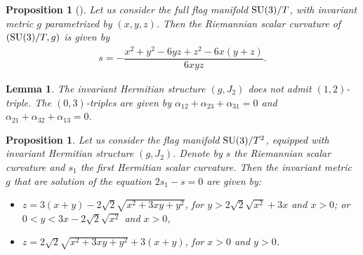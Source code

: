 \documentclass[pdftex]{sigma}%
\numberwithin{equation}{section}
\newtheorem{Lemma}[Theorem]{Lemma}
\newtheorem{Proposition}[Theorem]{Proposition}
 { \theoremstyle{definition}
\newtheorem{Definition}[Theorem]{Definition}
\newtheorem{Question}[Theorem]{Question}
\newtheorem*{Notation}{Notation}
\newtheorem{Example}[Theorem]{Example}
\newtheorem{Remark}[Theorem]{Remark} }
\begin{document}
\begin{Proposition}[\cite{grego}]
Let us consider the full flag manifold ${\rm SU}(3)/T$, with invariant metric $g$ parametrized by $(x,y,z)$. Then the Riemannian scalar curvature of $({\rm SU}(3)/T,g)$ is given by
\begin{gather*}
s= -\dfrac{x^{2}+y^{2}-6yz+z^{2}-6x(y+z)}{6xyz}.
\end{gather*}
\end{Proposition}

\begin{Lemma}
The invariant Hermitian structure $(g, J_{2})$ does not admit $(1,2)$-triple. The $(0,3)$-triples are given by $\alpha_{12}+\alpha_{23}+\alpha_{31}=0$ and $\alpha_{21}+\alpha_{32}+\alpha_{13}=0$.
\end{Lemma}

\begin{Proposition} \label{curv-su3}
Let us consider the flag manifold ${\rm SU}(3)/T^2$, equipped with invariant Hermitian structure $(g, J_{2})$. Denote by $s$ the Riemannian scalar curvature and $s_1$ the first Hermitian scalar curvature. Then the invariant metric $g$ that are solution of the equation $2s_1-s=0$ are given by:
 \begin{itemize}\itemsep=0pt
\item[$(i)$] $z=3 (x+y)-2 \sqrt{2} \sqrt{x^2+3 x y+y^2}$, for $y>2 \sqrt{2} \sqrt{x^2}+3 x$ and $x>0$; or
$0<y<3 x-2 \sqrt{2} \sqrt{x^2}$ and $x>0$,
\item[$(ii)$] $z=2 \sqrt{2} \sqrt{x^2+3 x y+y^2}+3 (x+y)$, for $x>0$ and $y>0$.
\end{itemize}
\end{Proposition}
\end{document}
